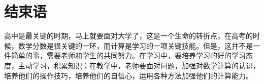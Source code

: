\chapter{结束语}

高中是最关键的时期，马上就要面对大学了，这是一个生命的转折点，在高考的时候，数学分数是很关键的一环，而计算是学习的一项关键技能。但是，这并不是一件简单的事，需要老师和学生的共同努力。在学习中，要培养学习的好的学习态度，主动学习，积累知识；在教学中，老师要面对问题，加强对数学计算的认识，培养他们的操作技巧，培养他们的自信心，运用各种方法加强他们的计算能力。